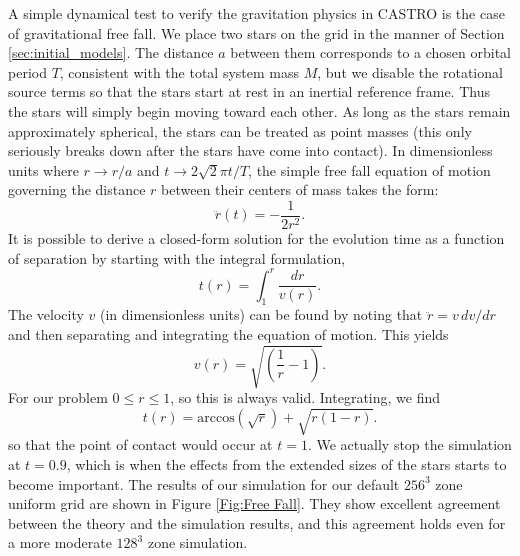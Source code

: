 \documentclass[iop]{emulateapj}
\begin{document}
A simple dynamical test to verify the gravitation physics in CASTRO is
the case of gravitational free fall. We place two stars on the grid 
in the manner of Section \ref{sec:initial_models}. The distance $a$ between 
them corresponds to a chosen orbital period $T$, consistent with the total
system mass $M$, but we disable the rotational source terms so that 
the stars start at rest in an inertial reference frame. 
Thus the stars will simply begin moving toward each other.
As long as the stars remain approximately spherical, the stars can be 
treated as point masses (this only seriously breaks down after the stars
have come into contact). In dimensionless units where $r \to r / a$ and 
$t \to 2\sqrt{2}\pi t / T$, the simple free fall equation of motion governing the
distance $r$ between their centers of mass takes the form:
\begin{equation}
  \ddot{r}(t) = - \frac{1}{2r^2}.
\end{equation}
It is possible to derive a closed-form solution for the evolution time
as a function of separation by starting with the integral formulation,
\begin{equation}
  t(r) = \int_{1}^{r} \frac{dr}{v(r)}.
\end{equation}
The velocity $v$ (in dimensionless units) can be found by noting that 
$\ddot{r} = v\, dv / dr$ and then separating and integrating the equation 
of motion. This yields 
\begin{equation}
  v(r) = \sqrt{\left(\frac{1}{r} - 1\right)}.
\end{equation}
For our problem $0 \leq r \leq 1$, so this is always valid. Integrating, we find
\begin{equation}
  t(r) = \text{arccos}\left(\sqrt{r}\right) + \sqrt{r \left(1 - r\right)}. \label{analyticalFreeFall}
\end{equation}
so that the point of contact would occur at $t = 1$. We actually stop the simulation
at $t = 0.9$, which is when the effects from the extended sizes of the stars
starts to become important. The results of our simulation for our default $256^3$ zone 
uniform grid are shown in Figure \ref{Fig:Free Fall}. They show excellent agreement
between the theory and the simulation results, and this agreement holds even for 
a more moderate $128^3$ zone simulation.
\end{document}
